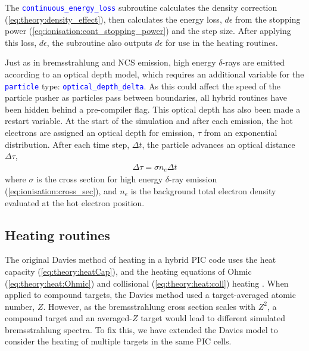 \documentclass[12pt]{article}
\numberwithin{equation}{section}
\begin{document}
The \textcolor{blue}{\texttt{continuous\_energy\_loss}} subroutine calculates the density correction (\ref{eq:theory:density_effect}), then calculates the energy loss, $d\epsilon$ from the stopping power (\ref{eq:ionisation:cont_stopping_power}) and the step size. After applying this loss, $d\epsilon$, the subroutine also outputs $d\epsilon$ for use in the heating routines.

Just as in bremsstrahlung and NCS emission, high energy $\delta$-rays are emitted according to an optical depth model, which requires an additional variable for the \textcolor{blue}{\texttt{particle}} type: \textcolor{blue}{\texttt{optical\_depth\_delta}}. As this could affect the speed of the particle pusher as particles pass between boundaries, all hybrid routines have been hidden behind a pre-compiler flag. This optical depth has also been made a restart variable. At the start of the simulation and after each emission, the hot electrons are assigned an optical depth for emission, $\tau$ from an exponential distribution. After each time step, $\Delta t$, the particle advances an optical distance $\Delta\tau$,
%
\begin{align}
  \Delta\tau = \sigma n_e\Delta t
\end{align}
%
where $\sigma$ is the cross section for high energy $\delta$-ray emission (\ref{eq:ionisation:cross_sec}), and $n_e$ is the background total electron density evaluated at the hot electron position.

\subsection{Heating routines} \label{sec:code:heating}

The original Davies method of heating in a hybrid PIC code uses the heat capacity (\ref{eq:theory:heatCap}), and the heating equations of Ohmic (\ref{eq:theory:heat:Ohmic}) and collisional (\ref{eq:theory:heat:coll}) heating \cite{hybrid:Davies:2002}. When applied to compound targets, the Davies method used a target-averaged atomic number, $Z$. However, as the bremsstrahlung cross section scales with $Z^2$, a compound target and an averaged-$Z$ target would lead to different simulated bremsstrahlung spectra. To fix this, we have extended the Davies model to consider the heating of multiple targets in the same PIC cells.
\end{document}
